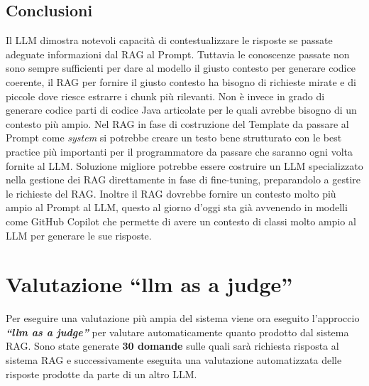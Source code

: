 \documentclass[12pt,a4paper,openright,twoside]{book}
\begin{document}
\subsection{Conclusioni}
Il LLM dimostra notevoli capacità di contestualizzare le risposte se passate adeguate informazioni dal RAG al Prompt.
Tuttavia le conoscenze passate non sono sempre sufficienti per dare al modello il giusto contesto per generare codice coerente,
il RAG per fornire il giusto contesto ha bisogno di richieste mirate e di piccole dove riesce estrarre i chunk più rilevanti.
Non è invece in grado di generare codice parti di codice Java articolate per le quali avrebbe bisogno di un contesto più ampio.
Nel RAG in fase di costruzione del Template da passare al Prompt come \emph{system} si potrebbe creare un testo bene strutturato con le best practice più importanti per il programmatore da passare che saranno ogni volta fornite al LLM.
Soluzione migliore potrebbe essere costruire un LLM specializzato nella gestione dei RAG direttamente in fase di fine-tuning, preparandolo a gestire le richieste del RAG.
Inoltre il RAG dovrebbe fornire un contesto molto più ampio al Prompt al LLM, questo al giorno d'oggi sta già avvenendo in modelli come GitHub Copilot che permette di avere un contesto di classi molto ampio al LLM 
per generare le sue risposte.
\section{Valutazione ``llm as a judge''}
Per eseguire una valutazione più ampia del sistema viene ora eseguito l'approccio \textbf{\emph{``llm as a judge''}} per valutare automaticamente quanto prodotto dal sistema RAG.
Sono state generate \textbf{30 domande} sulle quali sarà richiesta risposta al sistema RAG e successivamente eseguita una valutazione automatizzata delle risposte prodotte da parte di un altro LLM.
\end{document}
